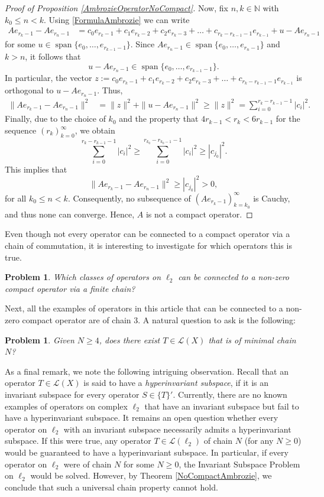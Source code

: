 \documentclass[a4paper,12pt]{article}
\newtheorem{problem}[thm]{Problem}
\theoremstyle{definition}
\numberwithin{equation}{section}
\numberwithin{thm}{section}
\newcommand{\N}{\mathbb{N}}
\begin{document}
\begin{proof}[Proof of Proposition \ref{AmbrozieOperatorNoCompact}]
Now, fix $n,k\in \N$ with $k_0\leq n<k$. Using \eqref{FormulaAmbrozie} we can write 
\begin{align*}
Ae_{r_k-1} - Ae_{r_n-1} &= c_0e_{r_k-1} + c_1e_{r_k-2}+c_2e_{r_k-3}+\dots+c_{r_k - r_{k-1}-1}e_{r_{k-1}}+u - Ae_{r_n-1}
\end{align*}
for some $u\in \operatorname{span}\{e_0,\dots,e_{r_{k-1}-1}\}$. Since $Ae_{r_n-1} \in \operatorname{span} \{e_0,\dots,e_{r_n-1}\}$ and $k>n$, it follows that 
$$u-Ae_{r_n-1}\in \operatorname{span}\{e_0,\dots,e_{r_{k-1}-1}\}.$$ 
In particular, the vector $z:=c_0e_{r_k-1} + c_1e_{r_k-2}+c_2e_{r_k-3}+\dots+c_{r_k - r_{k-1}-1}e_{r_{k-1}}$ is orthogonal to $u - Ae_{r_n-1}$. Thus,
\begin{align*}
\|Ae_{r_k-1} - Ae_{r_n-1}\|^2 &=\|z\|^2 +\|u-Ae_{r_n-1} \|^2 \geq \|z\|^2 = \sum_{i=0}^{r_k - r_{k-1}-1} |c_i|^2.
\end{align*}
Finally, due to the choice of $k_0$ and the property that $4r_{k-1}<r_k<6r_{k-1}$ for the sequence $(r_k)_{k=0}^\infty$, we obtain 
$$\sum_{i=0}^{r_k - r_{k-1}-1} |c_i|^2 \geq \sum_{i=0}^{r_{k_0} - r_{k_0-1}-1} |c_i|^2\geq |c_{j_0}|^2.$$ 
This implies that   
$$\|Ae_{r_k-1} - Ae_{r_n-1}\|^2 \geq |c_{j_0}|^2 >0,$$
for all $k_0\leq n<k$. Consequently, no subsequence of $(Ae_{r_k-1})_{k=k_0}^\infty$ is Cauchy, and thus none can converge. Hence, $A$ is not a compact operator.

\end{proof}

Even though not every operator can be connected to a compact operator via a chain of commutation, it is interesting to investigate for which operators this is true.
\begin{problem}
Which classes of operators on $\ell_2$ can be connected to a non-zero compact operator via a finite chain?
\end{problem}

Next, all the examples of operators in this article that can be connected to a non-zero compact operator are of chain $3$. A natural question to ask is the following:
\begin{problem}
Given $N\geq 4$, does there exist $T\in \mathcal{L}(X)$ that is of minimal chain $N$?
\end{problem}

As a final remark, we note the following intriguing observation. Recall that an operator $T\in \mathcal{L}(X)$ is said to have a \textit{hyperinvariant subspace}, if it is an invariant subspace for every operator $S\in \{T\}'$. Currently, there are no known examples of operators on complex $\ell_2$ that have an invariant subspace but fail to have a hyperinvariant subspace. It remains an open question whether every operator on $\ell_2$ with an invariant subspace necessarily admits a hyperinvariant subspace. If this were true, any operator $T\in \mathcal{L}(\ell_2)$ of chain $N$ (for any $N\geq 0$) would be guaranteed to have a hyperinvariant subspace. In particular, if every operator on $\ell_2$ were of chain $N$ for some $N\geq 0$, the Invariant Subspace Problem on $\ell_2$ would be solved. However, by Theorem \ref{NoCompactAmbrozie}, we conclude that such a universal chain property cannot hold.
\end{document}
